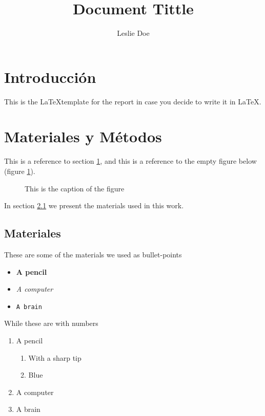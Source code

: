 \documentclass[a4paper,11pt]{article}
\title{Document Tittle}
\author{Leslie Doe}
\date{}
\begin{document}
\maketitle


\section{Introducci\'on}
\label{sec:introduction} 
This is the \LaTeX template for the report in case you decide to write
it in \LaTeX.

\section{Materiales y M\'etodos}
This is a reference to section \ref{sec:introduction}, and this is a
reference to the empty figure below (figure \ref{fig:empty}).

\begin{figure}[h]
  \begin{center}
  \caption{This is the caption of the figure} \label{fig:empty}
  \end{center}
\end{figure}

In section \ref{sec:materiales} we present the materials used in this
work. 

\subsection{Materiales}
\label{sec:materiales}
These are some of the materials we used as bullet-points
\begin{itemize}
\item \textbf{A pencil} %
\item \textit{A computer} %
\item \texttt{A brain} %
\end{itemize}

While these are with numbers
\begin{enumerate}
\item A pencil
  \begin{enumerate}[label=\roman*)]
  \item With a sharp tip
  \item Blue
  \end{enumerate}
\item A computer
\item A brain
\end{enumerate}
\end{document}
